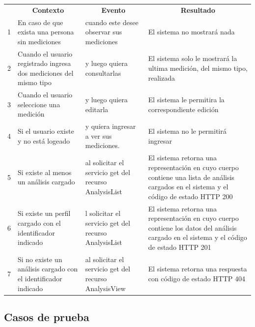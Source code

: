 \documentclass[a4paper,12pt]{article}
\begin{document}
\begin{center}
\begin{longtable}{|p{0.7cm}|p{4cm}|p{4cm}|p{5cm}| }

	\hline 
		\rowcolor[gray]{0.9} 
		\multicolumn{4}{|c|}{\textbf{Criterio de aceptación}} \\
	\hline
    	\rowcolor[gray]{0.9} 
    	\multicolumn{1}{|c}{\textbf{Id}} & \multicolumn{1}{|c}{\textbf{Contexto}} &  \multicolumn{1}{|c}{\textbf{Evento}} & \multicolumn{1}{|c|}{\textbf{Resultado}} \\
    \hline
    	
1&En caso de que exista una persona sin mediciones & cuando este desee observar sus mediciones  & El sistema no mostrará nada \\ \hline
 
2& Cuando el usuario registrado ingresa dos mediciones del mismo tipo  & y luego quiera consultarlas & El sistema solo le mostrará la ultima medición, del mismo tipo, realizada\\ \hline

3& Cuando el usuario seleccione una medición & y luego quiera editarla & El sistema le permitira la correspondiente edición\\ \hline

4& Si el usuario existe y no está logeado & y quiera ingresar a ver sus mediciones. & El sistema no le permitirá ingresar\\ \hline

5& Si existe al menos un análisis cargado & al solicitar el servicio get del recurso AnalysisList & El sistema retorna una representación en cuyo cuerpo contiene una lista de análisis cargados en el sistema y el código de estado HTTP 200\\ \hline

6& Si existe un perfil cargado con el identificador indicado & l solicitar el servicio get del recurso AnalysisList & El sistema retorna una representación en cuyo cuerpo contiene los datos del análisis cargado en el sistema y el código de estado HTTP 201\\ \hline

7& Si no existe un análisis cargado con el identificador indicado & al solicitar el servicio get del recurso AnalysisView & El sistema retorna una respuesta con código de estado HTTP 404\\ \hline
  \end{longtable}
\end{center}


\subsection{Casos de prueba}
\end{document}
